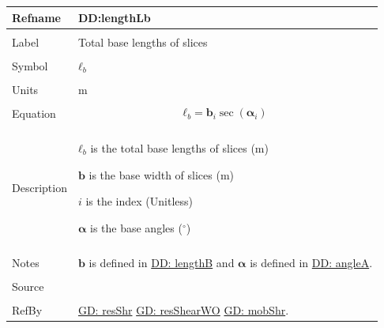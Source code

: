 \documentclass[12pt]{article}
\begin{document}
\noindent \begin{minipage}{\textwidth}
\begin{tabular}{p{} p{}}
\toprule \textbf{Refname} & \textbf{DD:lengthLb}
\label{DD:lengthLb}
\\ \midrule \\
Label & Total base lengths of slices
\\ \midrule \\
Symbol & ${\mathbf{ℓ}_{b}}$
\\ \midrule \\
Units & m
\\ \midrule \\
Equation & \begin{displaymath}
           {\mathbf{ℓ}_{b}}={\mathbf{b}}_{i} \sec\left({\mathbf{α}}_{i}\right)
           \end{displaymath}
\\ \midrule \\
Description & \begin{symbDescription}
              \item{${\mathbf{ℓ}_{b}}$ is the total base lengths of slices (m)}
              \item{$\mathbf{b}$ is the base width of slices (m)}
              \item{$i$ is the index (Unitless)}
              \item{$\mathbf{α}$ is the base angles (${}^{\circ}$)}
              \end{symbDescription}
\\ \midrule \\
Notes & $\mathbf{b}$ is defined in \hyperref[DD:lengthB]{DD: lengthB} and $\mathbf{α}$ is defined in \hyperref[DD:angleA]{DD: angleA}.
\\ \midrule \\
Source & \cite{fredlund1977}
\\ \midrule \\
RefBy & \hyperref[GD:resShr]{GD: resShr} \hyperref[GD:resShearWO]{GD: resShearWO} \hyperref[GD:mobShr]{GD: mobShr}.
\\ \bottomrule \end{tabular}
\end{minipage}
\par~
\end{document}
